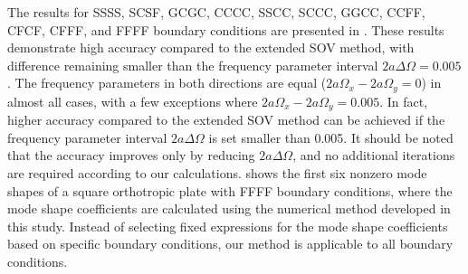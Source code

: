 \documentclass[preprint,12pt]{elsarticle}
\begin{document}
The results for SSSS, SCSF, GCGC, CCCC, SSCC, SCCC, GGCC, CCFF, CFCF, CFFF, and FFFF boundary conditions are presented in . 
These results demonstrate high accuracy compared to the extended SOV method, with difference remaining smaller than the frequency parameter interval $2a\Delta\Omega=0.005$. 
The frequency parameters in both directions are equal ($2a\Omega_x - 2a\Omega_y = 0$) in almost all cases, with a few exceptions where $2a\Omega_x - 2a\Omega_y = 0.005$. 
In fact, higher accuracy compared to the extended SOV method can be achieved if the frequency parameter interval $2a\Delta\Omega$ is set smaller than 0.005. It should be noted that the accuracy improves only by reducing $2a\Delta\Omega$, and no additional iterations are required according to our calculations.
 shows the first six nonzero mode shapes of a square orthotropic plate with FFFF boundary conditions, where the mode shape coefficients are calculated using the numerical method developed in this study. 
Instead of selecting fixed expressions for the mode shape coefficients based on specific boundary conditions, our method is applicable to all boundary conditions.
\end{document}
